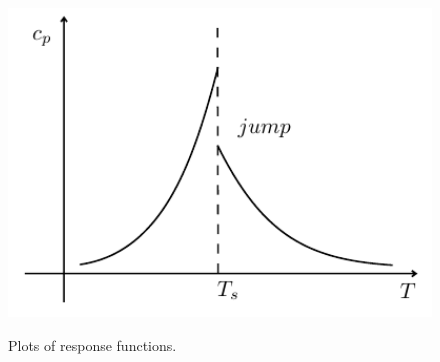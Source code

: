 \documentclass[../../Main/Main.tex]{subfiles}
\begin{document}
\begin{figure}[h!]
\begin{minipage}[c]{0.5\linewidth}
{\includegraphics[width=1\textwidth]{./img/8__2.pdf}

    \label{fig:3_04_3} }
\end{minipage}
\begin{minipage}[]{0.5\linewidth}
\centering
{}
\end{minipage}
\caption{\label{fig:} Plots of response functions.}
\end{figure}
\end{document}
